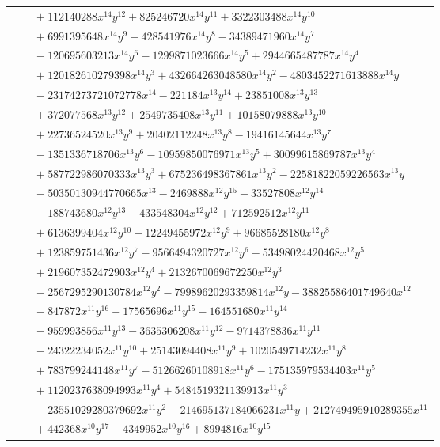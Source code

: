 \documentclass[11pt]{article}
\begin{document}
\begin{longtable}{@{}ll@{}}
 & $\quad +112140288x^{14}y^{12}+825246720x^{14}y^{11}+3322303488x^{14}y^{10}$\\
 & $\quad +6991395648x^{14}y^{9}-428541976x^{14}y^{8}-34389471960x^{14}y^{7}$\\
 & $\quad -120695603213x^{14}y^{6}-1299871023666x^{14}y^{5}+2944665487787x^{14}y^{4}$\\
 & $\quad +120182610279398x^{14}y^{3}+432664263048580x^{14}y^{2}-4803452271613888x^{14}y$\\
 & $\quad -23174273721072778x^{14}-221184x^{13}y^{14}+23851008x^{13}y^{13}$\\
 & $\quad +372077568x^{13}y^{12}+2549735408x^{13}y^{11}+10158079888x^{13}y^{10}$\\
 & $\quad +22736524520x^{13}y^{9}+20402112248x^{13}y^{8}-19416145644x^{13}y^{7}$\\
 & $\quad -1351336718706x^{13}y^{6}-10959850076971x^{13}y^{5}+30099615869787x^{13}y^{4}$\\
 & $\quad +587722986070333x^{13}y^{3}+675236498367861x^{13}y^{2}-22581822059226563x^{13}y$\\
 & $\quad -50350130944770665x^{13}-2469888x^{12}y^{15}-33527808x^{12}y^{14}$\\
 & $\quad -188743680x^{12}y^{13}-433548304x^{12}y^{12}+712592512x^{12}y^{11}$\\
 & $\quad +6136399404x^{12}y^{10}+12249455972x^{12}y^{9}+96685528180x^{12}y^{8}$\\
 & $\quad +123859751436x^{12}y^{7}-9566494320727x^{12}y^{6}-53498024420468x^{12}y^{5}$\\
 & $\quad +219607352472903x^{12}y^{4}+2132670069672250x^{12}y^{3}$\\
 & $\quad -2567295290130784x^{12}y^{2}-79989620293359814x^{12}y-38825586401749640x^{12}$\\
 & $\quad -847872x^{11}y^{16}-17565696x^{11}y^{15}-164551680x^{11}y^{14}$\\
 & $\quad -959993856x^{11}y^{13}-3635306208x^{11}y^{12}-9714378836x^{11}y^{11}$\\
 & $\quad -24322234052x^{11}y^{10}+25143094408x^{11}y^{9}+1020549714232x^{11}y^{8}$\\
 & $\quad +783799244148x^{11}y^{7}-51266260108918x^{11}y^{6}-175135979534403x^{11}y^{5}$\\
 & $\quad +1120237638094993x^{11}y^{4}+5484519321139913x^{11}y^{3}$\\
 & $\quad -23551029280379692x^{11}y^{2}-214695137184066231x^{11}y+212749495910289355x^{11}$\\
 & $\quad +442368x^{10}y^{17}+4349952x^{10}y^{16}+8994816x^{10}y^{15}$\\

\end{longtable}
\end{document}
